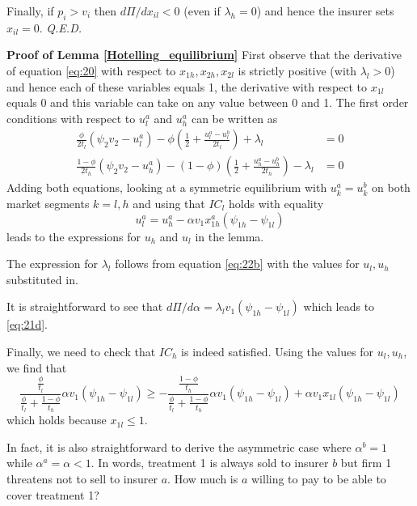 \documentclass[a4paper,12pt]{article}
\newcommand{\qed}{\hspace*{\fill} {\em Q.E.D.}}
\begin{document}
Finally, if \(p_i > v_i\) then \(d\Pi/dx_{il} <0\) (even if \(\lambda_h =0\)) and hence the insurer sets \(x_{il}=0\). 
 \qed


\textbf{Proof of Lemma \ref{Hotelling_equilibrium}}
First observe that the derivative of equation \eqref{eq:20} with respect to \(x_{1h},x_{2h},x_{2l}\) is strictly positive (with \(\lambda_l >0\)) and hence each of these variables equals 1, the derivative with respect to \(x_{1l}\) equals 0 and this variable can take on any value between 0 and 1. The first order conditions with respect to \(u_l^a\) and \(u_h^a\) can be written as
\begin{align}
\label{eq:22}
\frac{\phi}{2t_l}(\psi_2 v_2 - u_l^a) - \phi(\frac{1}{2} + \frac{u_l^a-u_l^b}{2t_l}) + \lambda_{l}  &=0 \\
\label{eq:22b}
\frac{1-\phi}{2t_h}(\psi_2 v_2 - u_h^a) - (1-\phi)(\frac{1}{2} + \frac{u_h^a-u_h^b}{2t_h}) - \lambda_{l}  &=0
\end{align}
Adding both equations, looking at a symmetric equilibrium with \(u_k^a=u_k^b\) on both market segments \(k=l,h\)  and using that \(IC_l\) holds with equality
\begin{equation}
\label{eq:23}
u_l^a = u_h^a - \alpha v_1 x_{1h}^a (\psi_{1h}-\psi_{1l})
\end{equation}
leads to the expressions for \(u_h\) and \(u_l\) in the lemma.

The expression for \(\lambda_{l}\) follows from equation \eqref{eq:22b} with the values for \(u_l,u_h\) substituted in.

It is straightforward to see that \(d\Pi/d\alpha = \lambda_{l} v_1 (\psi_{1h}-\psi_{1l})\) which leads to \eqref{eq:21d}.

Finally, we need to check that \(IC_h\) is indeed satisfied. Using the values for \(u_l,u_h\), we find that
\begin{equation}
\label{eq:24}
\frac{\frac{\phi}{t_l}}{\frac{\phi}{t_l}+\frac{1-\phi}{t_h}}\alpha v_1 (\psi_{1h}-\psi_{1l}) \geq -\frac{\frac{1-\phi}{t_h}}{\frac{\phi}{t_l}+\frac{1-\phi}{t_h}}\alpha v_1 (\psi_{1h}-\psi_{1l}) + \alpha v_1 x_{1l} (\psi_{1h}-\psi_{1l})
\end{equation}
which holds because \(x_{1l} \leq 1\).

In fact, it is also straightforward to derive the asymmetric case where \(\alpha^b =1\) while \(\alpha^a = \alpha <1\). In words, treatment 1 is always sold to insurer \(b\) but firm 1 threatens not to sell to insurer \(a\). How much is \(a\) willing to pay to be able to cover treatment 1?
\end{document}
